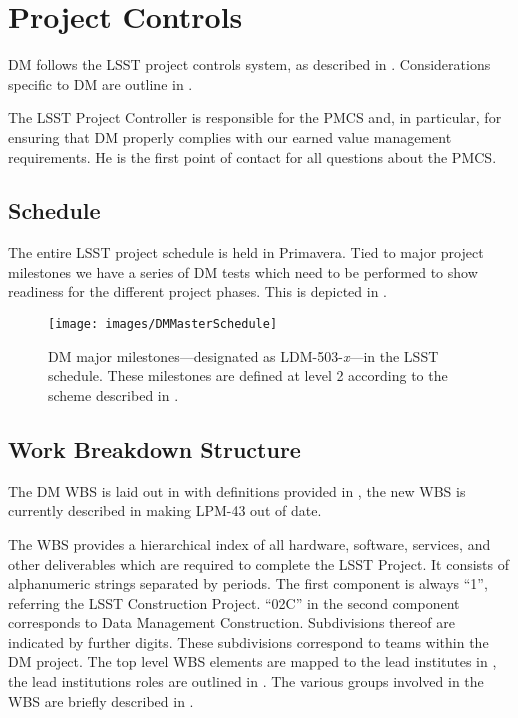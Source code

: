 \newpage
\section{Project Controls}\label{sect:dmpc}

DM follows the LSST project controls system, as described in .
Considerations specific to DM are outline in .

The LSST Project Controller is responsible for the PMCS and, in particular, for ensuring that DM properly complies with our earned value management requirements.
He is the first point of contact for all questions about the PMCS.

\subsection{Schedule}\label{sect:schedule}

The entire LSST project schedule is held in Primavera.
Tied to major project milestones we have a series of DM tests which need to be performed to show readiness for the different project phases.
This is depicted in .

\begin{figure}[htbp]
	\begin{center}
		 \texttt{[image: images/DMMasterSchedule]}
		 \caption{DM major milestones---designated as LDM-503-\textit{x}---in
         the LSST schedule. These milestones are defined at level 2 according
         to the scheme described in .}
         \label{fig:schedule}
	 \end{center}
 \end{figure}

\subsection{Work Breakdown Structure}\label{sect:WBS}

The DM WBS is laid out in  with definitions provided in ,
the new WBS is currently described in  making LPM-43 out of date.

The WBS provides a hierarchical index of all hardware, software, services, and other deliverables which are required to complete the LSST Project.
It consists of alphanumeric strings separated by periods.
The first component is always “1”, referring the LSST Construction Project.
``02C'' in the second component corresponds to Data Management Construction.
Subdivisions thereof are indicated by further digits.
These subdivisions correspond to teams within the DM project.
The top level WBS elements are mapped to the lead institutes in , the lead institutions roles are outlined in .
The various groups involved in the WBS are briefly described in .

